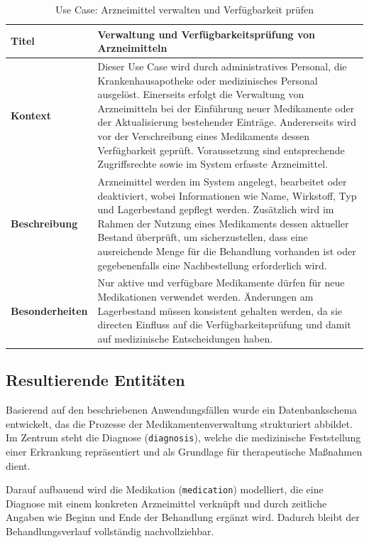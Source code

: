 \begin{table}[H]
\centering
\renewcommand{\arraystretch}{1.4}
\begin{tabularx}{\textwidth}{|p{4cm}|X|}
\hline
\textbf{Titel} & \textbf{Verwaltung und Verfügbarkeitsprüfung von Arzneimitteln} \\
\hline
\textbf{Kontext} &
Dieser Use Case wird durch administratives Personal, die Krankenhausapotheke oder medizinisches Personal ausgelöst. Einerseits erfolgt die Verwaltung von Arzneimitteln bei der Einführung neuer Medikamente oder der Aktualisierung bestehender Einträge. Andererseits wird vor der Verschreibung eines Medikaments dessen Verfügbarkeit geprüft. Voraussetzung sind entsprechende Zugriffsrechte sowie im System erfasste Arzneimittel. \\
\hline
\textbf{Beschreibung} &
Arzneimittel werden im System angelegt, bearbeitet oder deaktiviert, wobei Informationen wie Name, Wirkstoff, Typ und Lagerbestand gepflegt werden. Zusätzlich wird im Rahmen der Nutzung eines Medikaments dessen aktueller Bestand überprüft, um sicherzustellen, dass eine ausreichende Menge für die Behandlung vorhanden ist oder gegebenenfalls eine Nachbestellung erforderlich wird. \\
\hline
\textbf{Besonderheiten} &
Nur aktive und verfügbare Medikamente dürfen für neue Medikationen verwendet werden. Änderungen am Lagerbestand müssen konsistent gehalten werden, da sie directen Einfluss auf die Verfügbarkeitsprüfung und damit auf medizinische Entscheidungen haben. \\
\hline
\end{tabularx}
\caption{Use Case: Arzneimittel verwalten und Verfügbarkeit prüfen}
\end{table}

\vspace{1em}
\subsection*{Resultierende Entitäten}

Basierend auf den beschriebenen Anwendungsfällen wurde ein Datenbankschema entwickelt, das die Prozesse der Medikamentenverwaltung strukturiert abbildet. Im Zentrum steht die Diagnose (\texttt{diagnosis}), welche die medizinische Feststellung einer Erkrankung repräsentiert und als Grundlage für therapeutische Maßnahmen dient.

Darauf aufbauend wird die Medikation (\texttt{medication}) modelliert, die eine Diagnose mit einem konkreten Arzneimittel verknüpft und durch zeitliche Angaben wie Beginn und Ende der Behandlung ergänzt wird. Dadurch bleibt der Behandlungsverlauf vollständig nachvollziehbar.


